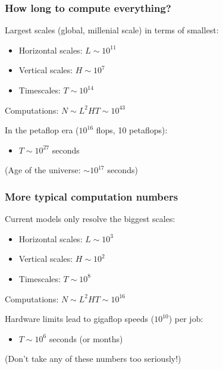 \documentclass[red]{beamer}
\begin{document}
\begin{frame}
    \frametitle{How long to compute everything?}
    
    Largest scales (global, millenial scale) in terms of smallest:
    \begin{itemize}
        \item Horizontal scales: $L \sim 10^{11}$
        \item Vertical scales: $H \sim 10^7$
        \item Timescales: $T \sim 10^{14}$
    \end{itemize}
    Computations: $N \sim L^2 H T \sim 10^{43}$
    
    \vspace{10pt}
    
    In the petaflop era ($10^{16}$ flops, 10 petaflops):
    \begin{itemize}
        \item $T \sim 10^{27}$ seconds
    \end{itemize}
    (Age of the universe: $\sim 10^{17}$ seconds)
\end{frame}

\begin{frame}
    \frametitle{More typical computation numbers}
    
    Current models only resolve the biggest scales:
    \begin{itemize}
        \item Horizontal scales: $L \sim 10^3$
        \item Vertical scales: $H \sim 10^2$
        \item Timescales: $T \sim 10^{8}$
    \end{itemize}
    Computations: $N \sim L^2 H T \sim 10^{16}$
    
    \vspace{10pt}
    
    Hardware limits lead to gigaflop speeds ($10^{10}$) per job:
    \begin{itemize}
        \item $T \sim 10^{6}$ seconds (or months)
    \end{itemize}
    (Don't take any of these numbers too seriously!)
\end{frame}
\end{document}
